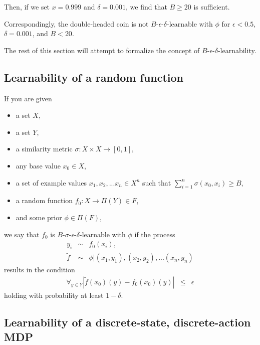 Then, if we set $x=0.999$ and $\delta=0.001$, we find that $B\geq20$ is sufficient.

Correspondingly, the double-headed coin is not $B$-$\epsilon$-$\delta$-learnable with $\phi$ for $\epsilon<0.5$, $\delta=0.001$, and $B<20$.

The rest of this section will attempt to formalize the concept of $B$-$\epsilon$-$\delta$-learnability.

\subsection{Learnability of a random function}

If you are given
\begin{itemize}
\item a set $X$,
\item a set $Y$,
\item a similarity metric $\sigma:X\times X\rightarrow[0,1]$,
\item any base value $x_0\in X$,
\item a set of example values $x_1,x_2,...x_n \in X^n$ such that $\sum_{i=1}^n \sigma(x_0, x_i) \geq B$,
\item a random function $f_0:X\rightarrow\Pi(Y) \in F$,
\item and some prior $\phi \in \Pi(F)$,
\end{itemize}
we say that $f_0$ is $B$-$\sigma$-$\epsilon$-$\delta$-learnable with $\phi$ if the process
\begin{eqnarray}
y_i &\sim& f_0(x_i),\\
\tilde f &\sim& \phi|(x_1,y_1),(x_2,y_2),...(x_n,y_n)
\end{eqnarray}
results in the condition
\begin{eqnarray}
\forall_{y\in Y}|\tilde f(x_0)(y)-f_0(x_0)(y)| &\leq& \epsilon
\end{eqnarray}
holding with probability at least $1-\delta$.

\subsection{Learnability of a discrete-state, discrete-action MDP}

